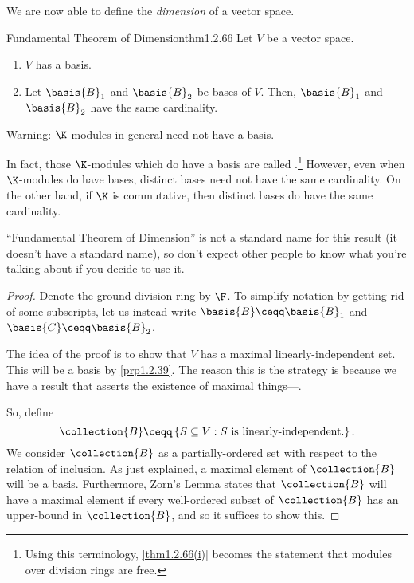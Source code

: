 We are now able to define the \emph{dimension} of a vector space.
\begin{thm}{Fundamental Theorem of Dimension}{thm1.2.66}
	Let $V$ be a vector space.
	\begin{enumerate}
		\item \label{thm1.2.66(i)}$V$ has a basis.
		\item \label{thm1.2.66(ii)}Let $\basis{B}_1$ and $\basis{B}_2$ be bases of $V$.  Then, $\basis{B}_1$ and $\basis{B}_2$ have the same cardinality.
	\end{enumerate}
	\begin{rmk}
		Warning:  $\K$-modules in general need not have a basis.
	\end{rmk}
	\begin{rmk}
		In fact, those $\K$-modules which do have a basis are called .\footnote{Using this terminology, \cref{thm1.2.66(i)} becomes the statement that modules over division rings are free.}  However, even when $\K$-modules do have bases, distinct bases need not have the same cardinality.  On the other hand, if $\K$ is commutative, then distinct bases do have the same cardinality.
	\end{rmk}
	\begin{rmk}
		``Fundamental Theorem of Dimension'' is not a standard name for this result (it doesn't have a standard name), so don't expect other people to know what you're talking about if you decide to use it.
	\end{rmk}
	\begin{proof}
		Denote the ground division ring by $\F$.  To simplify notation by getting rid of some subscripts, let us instead write $\basis{B}\ceqq \basis{B}_1$ and $\basis{C}\ceqq \basis{B}_2$.
		
		The idea of the proof is to show that $V$ has a maximal linearly-independent set.  This will be a basis by \cref{prp1.2.39}.  The reason this is the strategy is because we have a result that asserts the existence of maximal things---\emph{}.
		
		So, define
		\begin{equation}
		\collection{B}\ceqq \left\{ S\subseteq V:S\text{ is linearly-independent.}\right\} .
		\end{equation}
		We consider $\collection{B}$ as a partially-ordered set with respect to the relation of inclusion.  As just explained, a maximal element of $\collection{B}$ will be a basis.  Furthermore, Zorn's Lemma states that $\collection{B}$ will have a maximal element if every well-ordered subset of $\collection{B}$ has an upper-bound in $\collection{B}$, and so it suffices to show this.
		

\end{proof}
\end{thm}
